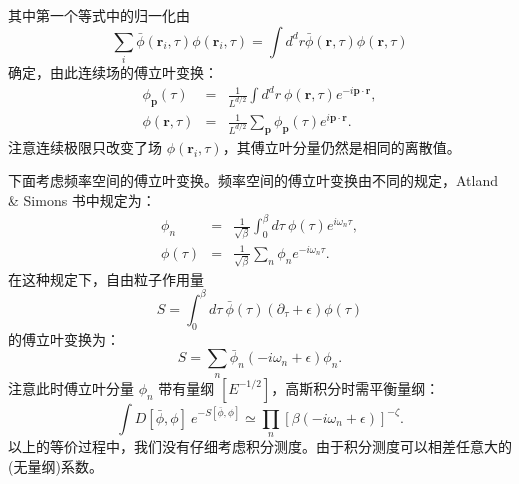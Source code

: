 \documentclass[UTF8]{ctexart}
\begin{document}
其中第一个等式中的归一化由
\begin{equation}
	\sum_i \bar\phi(\bm r_i,\tau) \phi(\bm r_i, \tau) = \int d^d r \bar\phi(\bm r,\tau)\phi(\bm r, \tau)
\end{equation}
确定，由此连续场的傅立叶变换：
\begin{eqnarray}
	\phi_{\bm p}(\tau) &=& \frac{1}{L^{d/2}} \int d^d r\ \phi(\bm r,\tau) e^{-i \bm p \cdot \bm r}, \\
	\phi(\bm r,\tau) &=& \frac{1}{L^{d/2}} \sum_{\bm p} \phi_{\bm p}(\tau) e^{i \bm p \cdot \bm r}.
\end{eqnarray}
注意连续极限只改变了场 $\phi(\bm r_i,\tau)$，其傅立叶分量仍然是相同的离散值。

下面考虑频率空间的傅立叶变换。频率空间的傅立叶变换由不同的规定，Atland \& Simons 书中规定为：
\begin{eqnarray}
	\phi_n &=& \frac{1}{\sqrt \beta} \int_0^\beta d\tau\ \phi(\tau) e^{i\omega_n \tau}, \\
	\phi(\tau) &=& \frac{1}{\sqrt \beta} \sum_{n} \phi_n e^{-i\omega_n \tau}.
\end{eqnarray}
在这种规定下，自由粒子作用量
\begin{equation}
	S = \int_0^\beta d\tau \ \bar\phi(\tau)(\partial_\tau + \epsilon) \phi(\tau)
\end{equation}
的傅立叶变换为：
\begin{equation}
	S = \sum_n \bar\phi_n (-i\omega_n + \epsilon) \phi_n.
\end{equation}
注意此时傅立叶分量 $\phi_n$ 带有量纲 $[E^{-1/2}]$，高斯积分时需平衡量纲：
\begin{equation}
	\int D[\bar\phi,\phi]\ e^{-S[\bar\phi,\phi]}
	\simeq \prod_n[\beta(-i\omega_n+\epsilon)]^{-\zeta}.
\end{equation}
以上的等价过程中，我们没有仔细考虑积分测度。由于积分测度可以相差任意大的(无量纲)系数。
\end{document}
